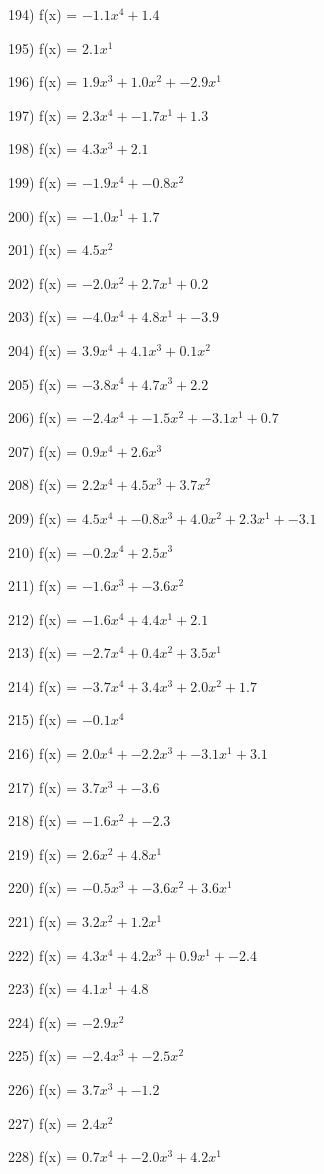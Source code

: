 \documentclass[10pt,a4paper]{article}
\begin{document}
194) f(x) = $-1.1x^4 + 1.4$

195) f(x) = $2.1x^1$

196) f(x) = $1.9x^3 + 1.0x^2 + -2.9x^1$

197) f(x) = $2.3x^4 + -1.7x^1 + 1.3$

198) f(x) = $4.3x^3 + 2.1$

199) f(x) = $-1.9x^4 + -0.8x^2$

200) f(x) = $-1.0x^1 + 1.7$

201) f(x) = $4.5x^2$

202) f(x) = $-2.0x^2 + 2.7x^1 + 0.2$

203) f(x) = $-4.0x^4 + 4.8x^1 + -3.9$

204) f(x) = $3.9x^4 + 4.1x^3 + 0.1x^2$

205) f(x) = $-3.8x^4 + 4.7x^3 + 2.2$

206) f(x) = $-2.4x^4 + -1.5x^2 + -3.1x^1 + 0.7$

207) f(x) = $0.9x^4 + 2.6x^3$

208) f(x) = $2.2x^4 + 4.5x^3 + 3.7x^2$

209) f(x) = $4.5x^4 + -0.8x^3 + 4.0x^2 + 2.3x^1 + -3.1$

210) f(x) = $-0.2x^4 + 2.5x^3$

211) f(x) = $-1.6x^3 + -3.6x^2$

212) f(x) = $-1.6x^4 + 4.4x^1 + 2.1$

213) f(x) = $-2.7x^4 + 0.4x^2 + 3.5x^1$

214) f(x) = $-3.7x^4 + 3.4x^3 + 2.0x^2 + 1.7$

215) f(x) = $-0.1x^4$

216) f(x) = $2.0x^4 + -2.2x^3 + -3.1x^1 + 3.1$

217) f(x) = $3.7x^3 + -3.6$

218) f(x) = $-1.6x^2 + -2.3$

219) f(x) = $2.6x^2 + 4.8x^1$

220) f(x) = $-0.5x^3 + -3.6x^2 + 3.6x^1$

221) f(x) = $3.2x^2 + 1.2x^1$

222) f(x) = $4.3x^4 + 4.2x^3 + 0.9x^1 + -2.4$

223) f(x) = $4.1x^1 + 4.8$

224) f(x) = $-2.9x^2$

225) f(x) = $-2.4x^3 + -2.5x^2$

226) f(x) = $3.7x^3 + -1.2$

227) f(x) = $2.4x^2$

228) f(x) = $0.7x^4 + -2.0x^3 + 4.2x^1$
\end{document}
